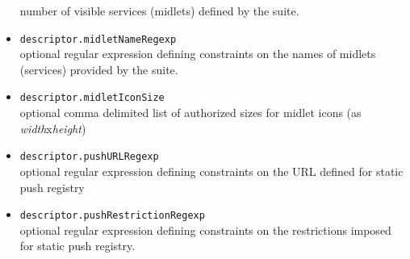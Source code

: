 \begin{itemize}
 number of visible services (midlets) defined by the suite.
\item{\texttt{descriptor.midletNameRegexp}}\\optional regular expression
defining constraints on the names of midlets (services) provided by the suite.
\item{\texttt{descriptor.midletIconSize}}\\optional comma delimited list of
authorized sizes for midlet icons (as \textit{width}x\textit{height})
\item{\texttt{descriptor.pushURLRegexp}}\\optional regular expression
defining constraints on the URL defined for static push registry
\item{\texttt{descriptor.pushRestrictionRegexp}}\\optional regular expression
defining constraints on the restrictions imposed for static push registry.
\end{itemize}





